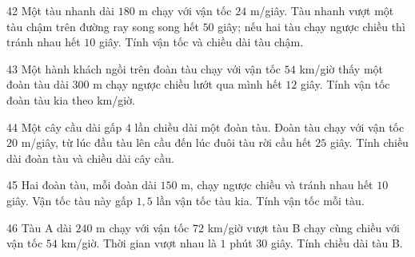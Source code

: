 \gap
\begin{probbox}{42}{}
Một tàu nhanh dài $180$ m chạy với vận tốc $24$ m/giây. Tàu nhanh vượt một tàu chậm trên đường ray song song hết $50$ giây; nếu hai tàu chạy ngược chiều thì tránh nhau hết $10$ giây. Tính vận tốc và chiều dài tàu chậm.
\end{probbox}
\gap
\begin{probbox}{43}{}
Một hành khách ngồi trên đoàn tàu chạy với vận tốc $54$ km/giờ thấy một đoàn tàu dài $300$ m chạy ngược chiều lướt qua mình hết $12$ giây. Tính vận tốc đoàn tàu kia theo km/giờ.
\end{probbox}
\gap
\begin{probbox}{44}{}
Một cây cầu dài gấp $4$ lần chiều dài một đoàn tàu. Đoàn tàu chạy với vận tốc $20$ m/giây, từ lúc đầu tàu lên cầu đến lúc đuôi tàu rời cầu hết $25$ giây. Tính chiều dài đoàn tàu và chiều dài cây cầu.
\end{probbox}
\gap
\begin{probbox}{45}{}
Hai đoàn tàu, mỗi đoàn dài $150$ m, chạy ngược chiều và tránh nhau hết $10$ giây. Vận tốc tàu này gấp $1{,}5$ lần vận tốc tàu kia. Tính vận tốc mỗi tàu.
\end{probbox}
\gap
\begin{probbox}{46}{}
Tàu A dài $240$ m chạy với vận tốc $72$ km/giờ vượt tàu B chạy cùng chiều với vận tốc $54$ km/giờ. Thời gian vượt nhau là $1$ phút $30$ giây. Tính chiều dài tàu B.
\end{probbox}
